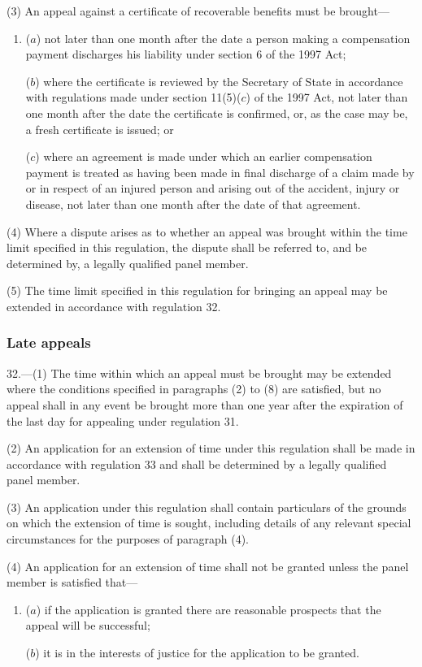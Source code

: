 \documentclass[12pt,a4paper]{article}
\begin{document}
(3) An appeal against a certificate of recoverable benefits must be brought—
\begin{enumerate}\item[]
($a$) not later than one month after the date a person making a compensation payment discharges his liability under section 6 of the 1997 Act;

($b$) where the certificate is reviewed by the Secretary of State in accordance with regulations made under section 11(5)($c$) of the 1997 Act, not later than one month after the date the certificate is confirmed, or, as the case may be, a fresh certificate is issued; or

($c$) where an agreement is made under which an earlier compensation payment is treated as having been made in final discharge of a claim made by or in respect of an injured person and arising out of the accident, injury or disease, not later than one month after the date of that agreement.
\end{enumerate}

(4) Where a dispute arises as to whether an appeal was brought within the time limit specified in this regulation, the dispute shall be referred to, and be determined by, a legally qualified panel member.

(5) The time limit specified in this regulation for bringing an appeal may be extended in accordance with regulation 32.

\subsubsection[32. Late appeals]{Late appeals}

32.—(1) The time within which an appeal must be brought may be extended where the conditions specified in paragraphs (2) to (8) are satisfied, but no appeal shall in any event be brought more than one year after the expiration of the last day for appealing under regulation 31.

(2) An application for an extension of time under this regulation shall be made in accordance with regulation 33 and shall be determined by a legally qualified panel member.

(3) An application under this regulation shall contain particulars of the grounds on which the extension of time is sought, including details of any relevant special circumstances for the purposes of paragraph (4).

(4) An application for an extension of time shall not be granted unless the panel member is satisfied that—
\begin{enumerate}\item[]
($a$) if the application is granted there are reasonable prospects that the appeal will be successful;

($b$) it is in the interests of justice for the application to be granted.
\end{enumerate}
\end{document}
